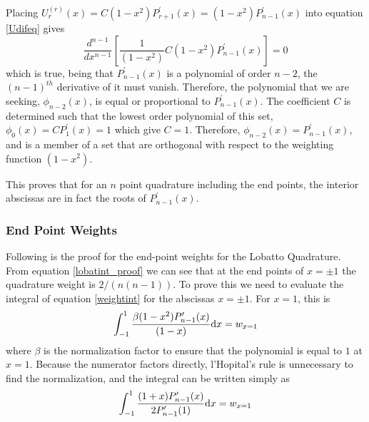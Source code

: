 \documentclass[preprint]{revtex4}
\newcommand{\dx}{{\rm d}x}
\newcommand{\intunit}{\ensuremath{\int_{-1}^{1}}}
\begin{document}
Placing $U_r^{(r)}(x)=C(1-x^2)P_{r+1}^\prime(x)=(1-x^2)P_{n-1}^\prime(x)$ into 
equation \ref{Udifeq} gives
\begin{equation}
\frac{d^{n-1}}{dx^{n-1}}\left[ \frac{1}{(1-x^2)}C(1-x^2)P_{n-1}^\prime(x) \right]=0
\end{equation}
which is true, being that $P_{n-1}^\prime(x)$ is a polynomial of order $n-2$, 
the $(n-1)^{th}$ derivative of it must vanish. Therefore, the polynomial that
we are seeking, $\phi_{n-2}(x)$, is equal or proportional to $P_{n-1}^\prime(x)$. 
The coefficient $C$ is determined such that the lowest order
polynomial of this set, $\phi_0(x)=CP_1^\prime(x)=1$ which give $C=1$. 
Therefore, $\phi_{n-2}(x)=P_{n-1}^\prime(x)$, and  is a member of a set that are 
orthogonal with respect to the weighting function $(1-x^2)$. 

This proves that for an $n$ point quadrature including the end points, the interior
abscissas are in fact the roots of $P_{n-1}^\prime(x)$. 

\subsubsection{End Point Weights}
Following is the proof for the end-point weights for the Lobatto Quadrature. From 
equation \ref{lobatint_proof} we can see that at the end points of $x=\pm 1$ the 
quadrature weight is $2/(n(n-1))$. To prove this we need to evaluate the integral of 
equation \ref{weightint} for the abscissas $x=\pm1$. For $x=1$, this is
\begin{equation}
\label{w_xp_1}
\intunit \frac{\beta(1-x^2)P^\prime_{n-1}(x)}{(1-x)}\dx = w_{x=1}
\end{equation}
where $\beta$ is the normalization factor to ensure that the polynomial is equal 
to $1$ at $x=1$. Because the numerator factors directly, l'Hopital's rule is unnecessary
to find the normalization, and the integral can be written simply as
\begin{equation}
\label{w_xp_2}
\intunit \frac{(1+x)P^\prime_{n-1}(x)}{2P^\prime_{n-1}(1)}\dx = w_{x=1}
\end{equation}
\end{document}
